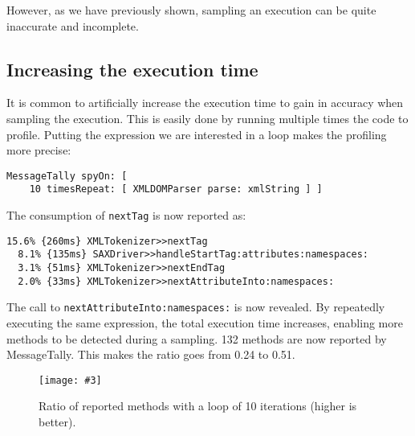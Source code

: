 \documentclass{sig-alternate}
\newcommand{\ct}{\lstinline[backgroundcolor=\color{white},basicstyle=\footnotesize\ttfamily]}
\newcommand{\fig}[4]{
	\begin{figure}[#1]
		\centering
		\texttt{[image: \#3]}
		\caption{\label{fig:#3}#4}
	\end{figure}}
\begin{document}

However, as we have previously shown, sampling an execution can be quite inaccurate and incomplete. 

\subsection{Increasing the execution time}


It is common to artificially increase the execution time to gain in accuracy when sampling the execution. This is easily done by running multiple times the code to profile. Putting the expression we are interested in a loop makes the profiling more precise:

\begin{lstlisting}
MessageTally spyOn: [  
	10 timesRepeat: [ XMLDOMParser parse: xmlString ] ]
\end{lstlisting}

The consumption of \ct{nextTag} is now reported as:

\begin{lstlisting}
15.6% {260ms} XMLTokenizer>>nextTag
  8.1% {135ms} SAXDriver>>handleStartTag:attributes:namespaces:
  3.1% {51ms} XMLTokenizer>>nextEndTag
  2.0% {33ms} XMLTokenizer>>nextAttributeInto:namespaces:
\end{lstlisting}

The call to \ct{nextAttributeInto:namespaces:} is now revealed. By repeatedly executing the same expression, the total execution time increases, enabling more methods to be detected during a sampling. 132 methods are now reported by MessageTally. This makes the ratio goes from 0.24 to 0.51.



\fig{h}{0.5}{RatioAfter10Loops}{Ratio of reported methods with a loop of 10 iterations (higher is better).}
\end{document}
